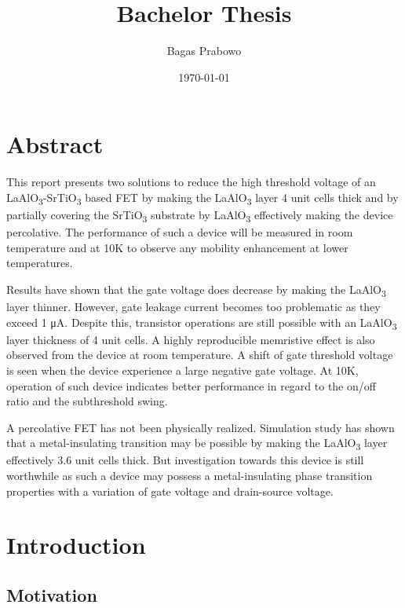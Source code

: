 \documentclass[11pt,a4paper]{report}
\title{Bachelor Thesis} %
\author{Bagas Prabowo}
\date{\today}
\begin{document}
\maketitle

\chapter*{Abstract}

This report presents two solutions to reduce the high threshold voltage of an LaAlO\textsubscript{3}-SrTiO\textsubscript{3} based FET by making the LaAlO\textsubscript{3} layer 4 unit cells thick and by partially covering the SrTiO\textsubscript{3} substrate by LaAlO\textsubscript{3} effectively making the device percolative. The performance of such a device will be measured in room temperature and at 10K to observe any mobility enhancement at lower temperatures.

Results have shown that the gate voltage does decrease by making the LaAlO\textsubscript{3} layer thinner. However, gate leakage current becomes too problematic as they exceed 1 \si{\micro A}. Despite this, transistor operations are still possible with an LaAlO\textsubscript{3} layer thickness of 4 unit cells. A highly reproducible memristive effect is also observed from the device at room temperature. A shift of gate threshold voltage is seen when the device experience a large negative gate voltage.  At 10K, operation of such device indicates better performance in regard to the on/off  ratio and the subthreshold swing. 

A percolative FET has not been physically realized. Simulation study has shown that a metal-insulating transition may be possible by making the LaAlO\textsubscript{3} layer effectively 3.6 unit cells thick. But investigation towards this device is still worthwhile as such a device may possess a metal-insulating phase transition properties with a variation of gate voltage and drain-source voltage.

\newpage
\tableofcontents
\chapter{Introduction}


\section{Motivation}

\end{document}
